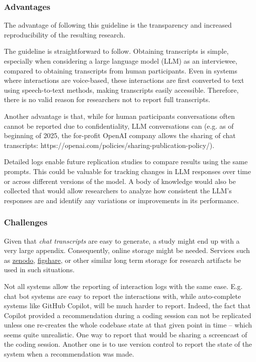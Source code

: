 

\subsubsection{Advantages}

The advantage of following this guideline is the transparency and increased reproducibility of the resulting research. 

The guideline is straightforward to follow. Obtaining transcripts is simple, especially when considering a large language model (LLM) as an interviewee, compared to obtaining transcripts from human participants. Even in systems where interactions are voice-based, these interactions are first converted to text using speech-to-text methods, making transcripts easily accessible. Therefore, there is no valid reason for researchers not to report full transcripts.

Another advantage is that, while for human participants conversations often cannot be reported due to confidentiality, LLM conversations can (e.g. as of beginning of 2025, the for-profit OpenAI company allows the sharing of chat transcripts: https://openai.com/policies/sharing-publication-policy/). 

Detailed logs enable future replication studies to compare results using the same prompts. This could be valuable for tracking changes in LLM responses over time or across different versions of the model. A body of knowledge would also be collected that would allow researchers to analyze how consistent the LLM's responses are and identify any variations or improvements in its performance.



\subsubsection{Challenges}

Given that {\em chat transcripts} are easy to generate, a study might end up with a very large appendix. Consequently, online storage might be needed. Services such as \href{https://zenodo.org}{zenodo}, \href{https://figshare.com/}{figshare}, or other similar long term storage for research artifacts \should be used in such situations.

Not all systems allow the reporting of interaction logs with the same ease. E.g. chat bot systems are easy to report the interactions with, while auto-complete systems like GitHub Copilot, will be much harder to report. Indeed, the fact that Copilot provided a recommendation during a coding session can not be replicated unless one re-creates the whole codebase state at that given point in time -- which seems quite unrealistic. One way to report that would be sharing a screencast of the coding session. Another one is to use version control to report the state of the system when a recommendation was made.

